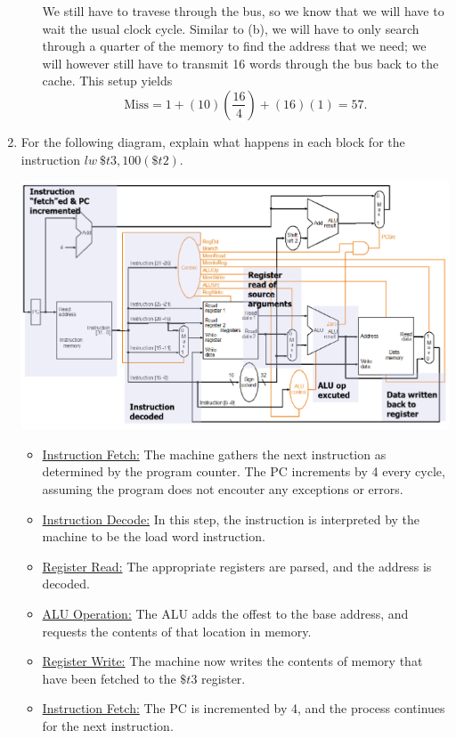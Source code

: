 \documentclass{article}
\begin{document}
\begin{enumerate}
\begin{enumerate}
We still have to travese through the bus, so we know that we will have to wait the usual clock cycle.
Similar to (b), we will have to only search through a quarter of the memory to find the address that we need; we will however still have to transmit 16 words through the bus back to the cache.
This setup yields
\[
\text{Miss} = 1 + (10)\left(\frac{16}{4}\right) + (16)(1) = 57.
\]
\end{enumerate}
\item For the following diagram, explain what happens in each block for the instruction $lw\ \$t3, 100(\$t2)$.
\begin{center}
\includegraphics[scale=0.5]{review_01}
\end{center}
\begin{itemize}
\item \underline{Instruction Fetch:} The machine gathers the next instruction as determined by the program counter.
The PC increments by 4 every cycle, assuming the program does not encouter any exceptions or errors.
\item \underline{Instruction Decode:} In this step, the instruction is interpreted by the machine to be the load word instruction.
\item \underline{Register Read:} The appropriate registers are parsed, and the address is decoded.
\item \underline{ALU Operation:} The ALU adds the offest to the base address, and requests the contents of that location in memory.
\item \underline {Register Write:} The machine now writes the contents of memory that have been fetched to the $\$t3$ register.
\item \underline {Instruction Fetch:} The PC is incremented by 4, and the process continues for the next instruction.
\end{itemize}

\end{enumerate}
\end{document}
